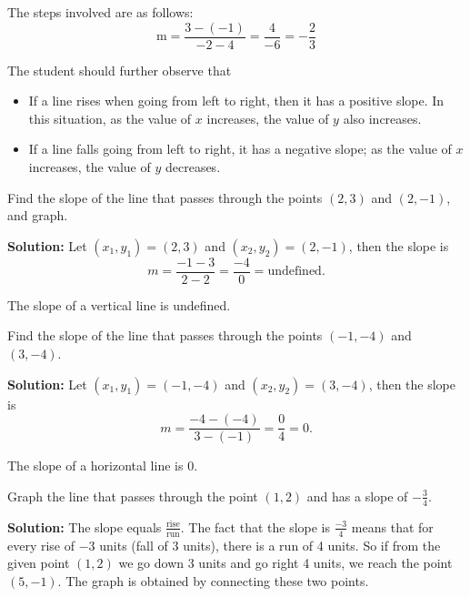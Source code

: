 The steps involved are as follows:
\[
\text{m} = \frac{3 - (-1)}{-2 - 4} = \frac{4}{-6} = -\frac{2}{3}
\]

The student should further observe that
\begin{itemize}
    \item If a line rises when going from left to right, then it has a positive slope. In this situation, as the value of $x$ increases, the value of $y$ also increases.
    \item If a line falls going from left to right, it has a negative slope; as the value of $x$ increases, the value of $y$ decreases.
\end{itemize}

\begin{example}
Find the slope of the line that passes through the points $(2, 3)$ and $(2, -1)$, and graph.
\end{example}

\textbf{Solution:} Let $(x_1, y_1) = (2, 3)$ and $(x_2, y_2) = (2, -1)$, then the slope is
\[ m = \frac{-1 - 3}{2 - 2} = \frac{-4}{0} = \text{undefined}.\]


\begin{note}
The slope of a vertical line is undefined.
\end{note}

\begin{example}
Find the slope of the line that passes through the points $(-1, -4)$ and $(3, -4)$.
\end{example}

\textbf{Solution:} Let $(x_1, y_1) = (-1, -4)$ and $(x_2, y_2) = (3, -4)$, then the slope is
\[ m = \frac{-4 - (-4)}{3 - (-1)} = \frac{0}{4} = 0.\]


\begin{note}
The slope of a horizontal line is $0$.
\end{note}

\begin{example}
Graph the line that passes through the point $(1, 2)$ and has a slope of $-\frac{3}{4}$.
\end{example}

\textbf{Solution:} The slope equals $\frac{\text{rise}}{\text{run}}$. The fact that the slope is $\frac{-3}{4}$ means that for every rise of $-3$ units (fall of 3 units), there is a run of 4 units. So if from the given point $(1, 2)$ we go down 3 units and go right 4 units, we reach the point $(5, -1)$. The graph is obtained by connecting these two points.

